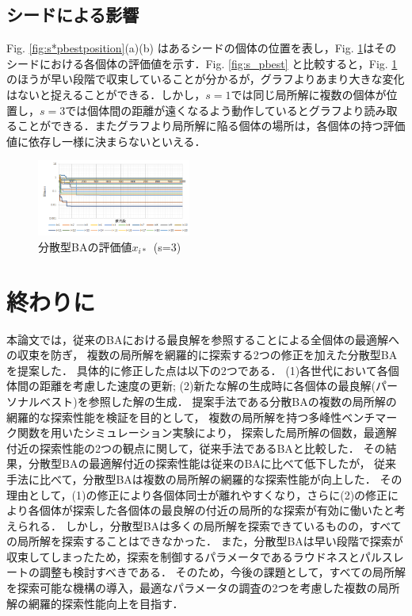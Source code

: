 \documentclass{jarticle}
\begin{document}
\subsection{シードによる影響}
Fig. \ref{fig:s*pbestposition}(a)(b) はあるシードの個体の位置を表し，Fig. \ref{fig:pbest_i=3}はそのシードにおける各個体の評価値を示す．Fig. \ref{fig:s_pbest} と比較すると，Fig. \ref{fig:pbest_i=3} のほうが早い段階で収束していることが分かるが，グラフよりあまり大きな変化はないと捉えることができる．しかし，${s=1}$では同じ局所解に複数の個体が位置し，${s=3}$では個体間の距離が遠くなるよう動作しているとグラフより読み取ることができる．またグラフより局所解に陥る個体の場所は，各個体の持つ評価値に依存し一様に決まらないといえる．
\begin{figure}[t]
\begin{center}
\includegraphics[width=0.45\textwidth]{sbat03_n20_pbest.bmp}
\caption{分散型BAの評価値${x_{i*}}$\  (s=3)}
\label{fig:pbest_i=3}
\end{center}
\end{figure}

\section{終わりに}
本論文では，従来のBAにおける最良解を参照することによる全個体の最適解への収束を防ぎ，
複数の局所解を網羅的に探索する2つの修正を加えた分散型BAを提案した．
具体的に修正した点は以下の2つである．
(1)各世代において各個体間の距離を考慮した速度の更新;
(2)新たな解の生成時に各個体の最良解(パーソナルベスト)を参照した解の生成．
提案手法である分散BAの複数の局所解の網羅的な探索性能を検証を目的として，
複数の局所解を持つ多峰性ベンチマーク関数を用いたシミュレーション実験により，
探索した局所解の個数，最適解付近の探索性能の2つの観点に関して，従来手法であるBAと比較した．
その結果，分散型BAの最適解付近の探索性能は従来のBAに比べて低下したが，
従来手法に比べて，分散型BAは複数の局所解の網羅的な探索性能が向上した．
その理由として，(1)の修正により各個体同士が離れやすくなり，さらに(2)の修正により各個体が探索した各個体の最良解の付近の局所的な探索が有効に働いたと考えられる．
しかし，分散型BAは多くの局所解を探索できているものの，すべての局所解を探索することはできなかった．
また，分散型BAは早い段階で探索が収束してしまったため，探索を制御するパラメータであるラウドネスとパルスレートの調整も検討すべきである．
そのため，今後の課題として，すべての局所解を探索可能な機構の導入，最適なパラメータの調査の2つを考慮した複数の局所解の網羅的探索性能向上を目指す．\\
\end{document}
